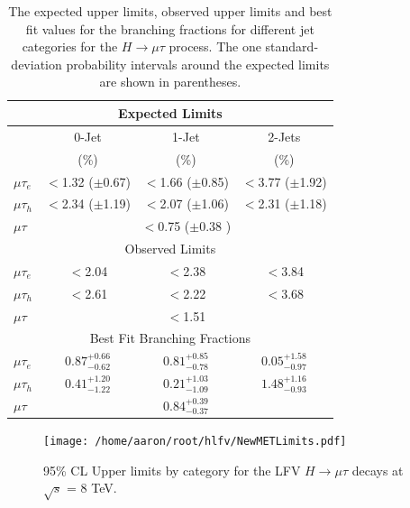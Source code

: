 \documentclass[oneside, letterpaper, oldfontcommands]{memoir}
\begin{document}
\begin{table}[hbtp]
 \centering
  \caption{The expected upper limits, observed upper limits and best fit values for the branching fractions for different
    jet categories for the $H \rightarrow \mu \tau$  process.
    The one standard-deviation probability intervals around the expected limits are shown in parentheses.}
  \label{tab:expected_limits}
   \begin{tabular}{l|c|c|c} \hline
\multicolumn{4}{c}{Expected Limits} \\ \hline
                       &  \multicolumn{1}{c|}{0-Jet}   & \multicolumn{1}{c}{1-Jet}    &  \multicolumn{1}{|c}{2-Jets}                 \\
                       & (\%)                     & (\%)                     & (\%)                    \\ \cline{2-4}
          $\mu\tau_{e}$  &  $<$1.32 ($\pm$0.67)   &  $<$1.66 ($\pm$0.85)   &  $<$3.77 ($\pm$1.92)  \\
      $\mu\tau_{h}$    &  $<$2.34 ($\pm$1.19)   &  $<$2.07 ($\pm$1.06)   &  $<$2.31 ($\pm$1.18)  \\ \hline
            $\mu\tau$  &        \multicolumn{3}{c}{  $<$0.75 ($\pm$0.38 ) }                              \\ \hline
\multicolumn{4}{c}{Observed Limits} \\ \hline
          $\mu\tau_{e}$  &  $<$2.04                &  $<$2.38                &  $<$3.84   \\
      $\mu\tau_{h}$    &  $<$2.61                &  $<$2.22                &  $<$3.68   \\ \hline
            $\mu\tau$  & \multicolumn{3}{c}{  $<$1.51 }   \\ \hline
\multicolumn{4}{c}{Best Fit Branching Fractions} \\ \hline
      \rule[-5pt]{0pt}{17pt}
      $\mu\tau_{e}$  &  $0.87^{+0.66}_{-0.62}$  &  $0.81^{+0.85}_{-0.78}$  &  $0.05^{+1.58}_{-0.97}$  \\
      \rule[-5pt]{0pt}{17pt}
      $\mu\tau_{h}$    &  $0.41^{+1.20}_{-1.22}$  &  $0.21^{+1.03}_{-1.09}$  &  $1.48^{+1.16}_{-0.93}$  \\ \hline
      \rule[-5pt]{0pt}{17pt}
      $\mu\tau$  & \multicolumn{3}{c}{ $0.84^{+0.39}_{-0.37}$ }   \\ \hline
  \end{tabular}
\end{table}
\begin{figure}[hbtp]\centering
\texttt{[image: /home/aaron/root/hlfv/NewMETLimits.pdf]}
 \caption{95\% CL Upper limits by category for the LFV $H \rightarrow \mu \tau$ decays at $\sqrt{s}$ = 8 TeV.}
 \label{fig:limits_summary}\end{figure}
\end{document}
